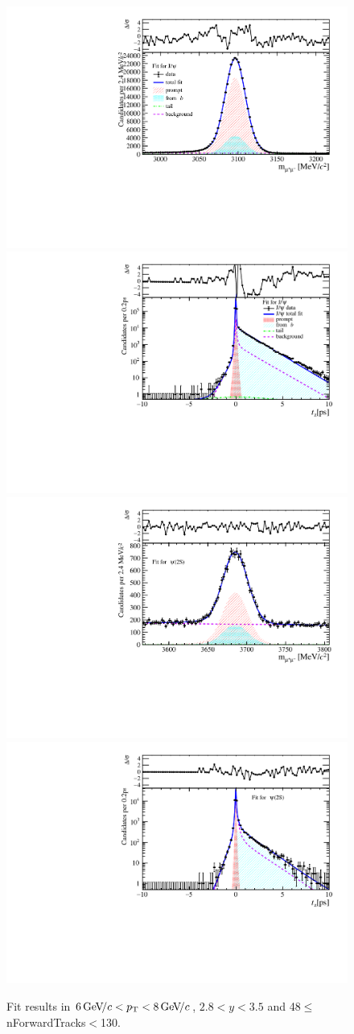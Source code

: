 \begin{figure}[H]
\begin{center}
\includegraphics[width=0.47\linewidth]{pdf/Jpsi/drawmassF/n5y2pt4.pdf}
\includegraphics[width=0.47\linewidth]{pdf/Jpsi/2DFitF/n5y2pt4.pdf}
\vspace*{-0.5cm}
\includegraphics[width=0.47\linewidth]{pdf/Psi2S/drawmassF/n5y2pt4.pdf}
\includegraphics[width=0.47\linewidth]{pdf/Psi2S/2DFitF/n5y2pt4.pdf}
\vspace*{-0.5cm}
\end{center}
\caption{Fit results in $6\text{\,Ge\kern -0.1em V\!/}c<p_{\mathrm{T}}<8\text{\,Ge\kern -0.1em V\!/}c$, $2.8<y<3.5$ and 48$\leq$nForwardTracks$<$130.}
\label{Fitn5y2pt4}
\end{figure}
